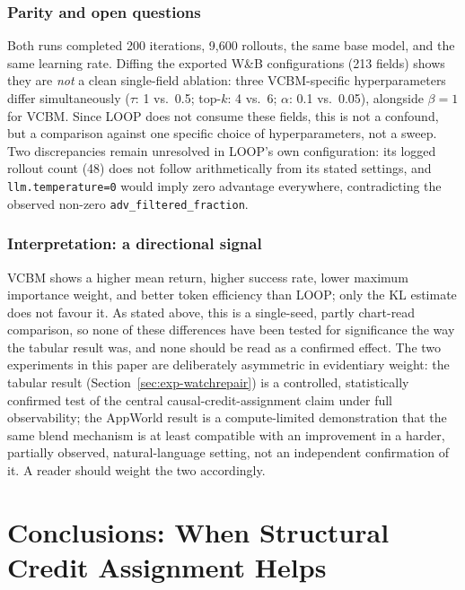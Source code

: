 \documentclass[conference]{IEEEtran}
\begin{document}
\subsubsection{Parity and open questions}
Both runs completed 200 iterations, 9,600 rollouts, the same base model, and the same learning rate. Diffing the exported W\&B configurations (213 fields) shows they are \emph{not} a clean single-field ablation: three VCBM-specific hyperparameters differ simultaneously ($\tau$: 1 vs.\ 0.5; top-$k$: 4 vs.\ 6; $\alpha$: 0.1 vs.\ 0.05), alongside $\beta=1$ for VCBM. Since LOOP does not consume these fields, this is not a confound, but a comparison against one specific choice of hyperparameters, not a sweep. Two discrepancies remain unresolved in LOOP's own configuration: its logged rollout count (48) does not follow arithmetically from its stated settings, and \texttt{llm.temperature=0} would imply zero advantage everywhere, contradicting the observed non-zero \texttt{adv\_filtered\_fraction}.

\subsubsection{Interpretation: a directional signal}
VCBM shows a higher mean return, higher success rate, lower maximum importance weight, and better token efficiency than LOOP; only the KL estimate does not favour it. As stated above, this is a single-seed, partly chart-read comparison, so none of these differences have been tested for significance the way the tabular result was, and none should be read as a confirmed effect. The two experiments in this paper are deliberately asymmetric in evidentiary weight: the tabular result (Section~\ref{sec:exp-watchrepair}) is a controlled, statistically confirmed test of the central causal-credit-assignment claim under full observability; the AppWorld result is a compute-limited demonstration that the same blend mechanism is at least compatible with an improvement in a harder, partially observed, natural-language setting, not an independent confirmation of it. A reader should weight the two accordingly.

\section{Conclusions: When Structural Credit Assignment Helps}
\label{sec:conclusions}
\end{document}
